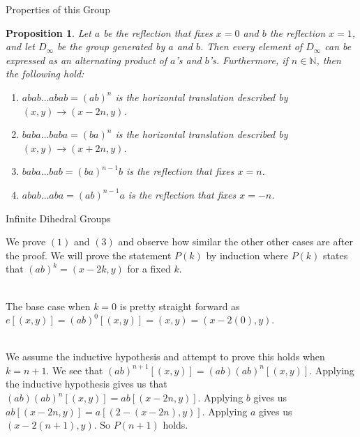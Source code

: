 \documentclass[usenames,dvipsnames]{beamer}
\newtheorem{proposition}{Proposition}
\begin{document}
\begin{frame}{Properties of this Group}

\begin{proposition}

Let $a$ be the reflection that fixes $x=0$ and $b$ the reflection $x=1$, and let $D_\infty$ be the group
generated by $a$ and $b$. Then every element of $D_\infty$ can be expressed as an alternating product of
$a$'s and $b$'s. Furthermore, if $n\in \mathbb{N}$, then the following hold:

\begin{enumerate}
  \item $abab\ldots abab=(ab)^{n}$ is the horizontal translation described by $(x,y)\rightarrow (x-2n,y)$.
  \item $baba\ldots baba=(ba)^{n}$ is the horizontal translation described by $(x,y)\rightarrow (x+2n,y)$.
  \item $baba\ldots bab=(ba)^{n-1}b$ is the reflection that fixes $x=n$.
  \item $abab\ldots aba=(ab)^{n-1}a$ is the reflection that fixes $x=-n$.
\end{enumerate}

\end{proposition}

\end{frame}

\begin{frame}{Infinite Dihedral Groups}

We prove $(1)$ and $(3)$ and observe how similar the other other cases are after the proof. We will prove
the statement $P(k)$ by induction where $P(k)$ states that $(ab)^{k}=(x-2k,y)$ for a fixed $k$. \\~\\

\pause{}

The base case when $k=0$ is pretty straight forward as $e[(x,y)]=(ab)^{0}[(x,y)]=(x,y)=(x-2(0),y)$. \\~\\

\pause{}

We assume the inductive hypothesis and attempt to prove this holds when $k=n+1$. We see that
$(ab)^{n+1}[(x,y)]=(ab)(ab)^{n}[(x,y)]$. Applying the inductive hypothesis gives us that
$(ab)(ab)^{n}[(x,y)]=ab[(x-2n,y)]$. Applying $b$ gives us $ab[(x-2n,y)]=a[(2-(x-2n),y)]$. Applying $a$
gives us $(x-2(n+1),y)$. So $P(n+1)$ holds.

\end{frame}
\end{document}
